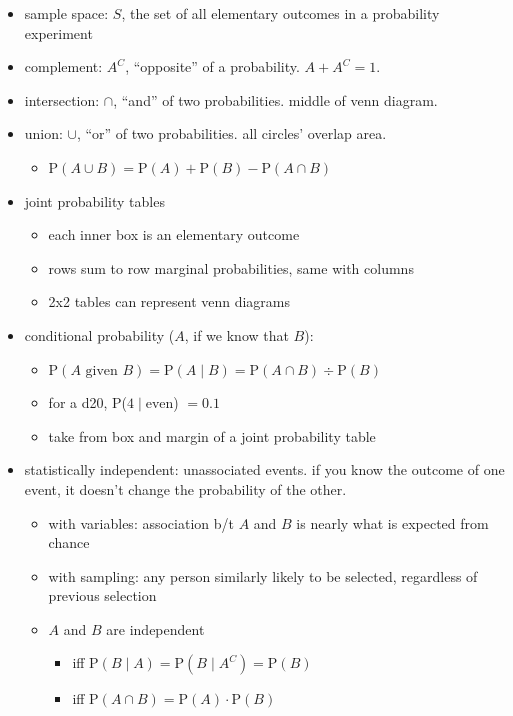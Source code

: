 \documentclass[11pt]{article}
\begin{document}
\begin{itemize}
  \item sample space: $S$, the set of all elementary outcomes in a probability experiment
  \item complement: $A^C$, ``opposite'' of a probability. $A + A^C = 1$.
  \item intersection: $\cap$, ``and'' of two probabilities. middle of venn diagram.
  \item union: $\cup$, ``or'' of two probabilities. all circles' overlap area.
  \begin{itemize}
    \item P$(A \cup B) = \text{P}(A) + \text{P}(B) - \text{P}(A \cap B)$
  \end{itemize}
  \item joint probability tables
  \begin{itemize}
    \item each inner box is an elementary outcome
    \item rows sum to row marginal probabilities, same with columns
    \item 2x2 tables can represent venn diagrams
  \end{itemize}
  \newpage
  \item conditional probability ($A$, if we know that $B$):
  \begin{itemize}
    \item P$(A \text{ given } B) = \text{P}(A \mid B) = \text{P}(A \cap B) \div \text{P}(B)$
    \item for a d20, P($4 \mid \text{even}$) $= 0.1$
    \item take from box and margin of a joint probability table
  \end{itemize}
  \item statistically independent: unassociated events. if you know the outcome of one event, it doesn't change the probability of the other.
  \begin{itemize}
    \item with variables: association b/t $A$ and $B$ is nearly what is expected from chance
    \item with sampling: any person similarly likely to be selected, regardless of previous selection
    \item $A$ and $B$ are independent
    \begin{itemize}
      \item iff $\text{P}(B\mid A) = \text{P}(B\mid A^C) = \text{P}(B)$
      \item iff $\text{P}(A \cap B) = \text{P}(A) \cdot \text{P}(B)$
    \end{itemize}
  \end{itemize}
\end{itemize}
\end{document}
